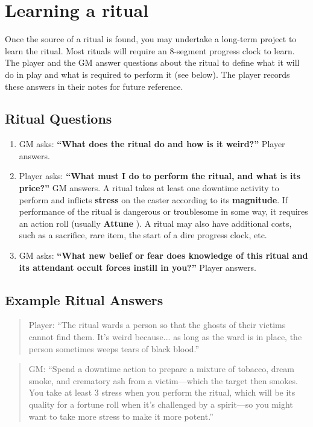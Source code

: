 \documentclass[11pt,fleqn,a5paper]{book}
\newcommand{\gameterm}[1]{\textbf{#1}}
\begin{document}
\section{Learning a ritual}

Once the source of a ritual is found, you may undertake a long-term project to learn the ritual. Most rituals will require an 8-segment progress clock to learn. The player and the GM answer questions about the ritual to define what it will do in play and what is required to perform it (see below). The player records these answers in their notes for future reference.

\subsection{Ritual Questions}
\begin{enumerate}
	\item GM asks: \textbf{“What does the ritual do and how is it weird?”} Player answers.
	\item Player asks: \textbf{“What must I do to perform the ritual, and what is its price?” }GM answers. A ritual takes at least one downtime activity to perform and inflicts \textbf{stress} on the caster according to its \textbf{magnitude}.  If performance of the ritual is dangerous or troublesome in some way, it requires an action roll (usually \gameterm{Attune} ). A ritual may also have additional costs, such as a sacrifice, rare item, the start of a dire progress clock, etc.
	\item GM asks: \textbf{“What new belief or fear does knowledge of this ritual and its attendant occult forces instill in you?”} Player answers.
\end{enumerate}

\subsection{Example Ritual Answers}

\begin{quote}
	Player: “The ritual wards a person so that the ghosts of their victims cannot find them. It’s weird because... as long as the ward is in place, the person sometimes weeps tears of black blood.”
\end{quote} 

\begin{quote}
	GM: “Spend a downtime action to prepare a mixture of tobacco, dream smoke, and crematory ash from a victim---which the target then smokes. You take at least 3 stress when you perform the ritual, which will be its quality for a fortune roll when it’s challenged by a spirit---so you might want to take more stress to make it more potent.”
\end{quote} 
\end{document}
